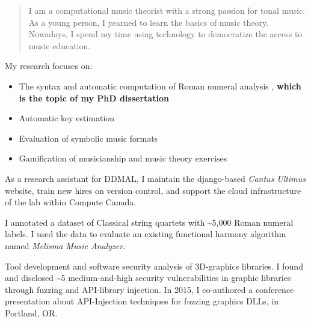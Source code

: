 \documentclass[10pt,a4paper,ragged2e,withhyper]{altacv}
\begin{document}
\begin{paracol}{2}

\begin{quote}
I am a computational music theorist with a strong passion for tonal music.
As a young person, I yearned to learn the basics of music theory.
Nowadays, I spend my time using technology to democratize the access to music education.
\end{quote}


My research focuses on:
\begin{itemize}
    \item The syntax \parencite{napoles_lopez_harmalysis_2020} and automatic computation of Roman numeral analysis \parencite{napoles_lopez_augmentednet_2021}, \textbf{which is the topic of my PhD dissertation}
    \item Automatic key estimation \parencite{napoles_lopez_key-finding_2019, napoles_lopez_local_2020}
    \item Evaluation of symbolic music formats \parencite{napoles_lopez_encoding_2018, napoles_lopez_effects_2019}
    \item Gamification of musicianship and music theory exercises \parencite{napoles_lopez_-re-myth_2020, napoles_lopez_dandelot_2019}
\end{itemize}
As a research assistant for DDMAL, I maintain the django-based \emph{Cantus Ultimus} website, train new hires on version control, and support the cloud infrastructure of the lab within Compute Canada.

\medskip

I annotated a dataset of Classical string quartets with \textasciitilde{}5,000 Roman numeral labels. 
I used the data to evaluate an existing functional harmony algorithm named \emph{Melisma Music Analyzer}.

\medskip

Tool development and software security analysis of 3D-graphics libraries. 
I found and disclosed \textasciitilde{}5 medium-and-high security vulnerabilities in graphic libraries through fuzzing and API-library injection. 
In 2015, I co-authored a conference presentation about API-Injection techniques for fuzzing graphics DLLs, in Portland, OR.


\end{paracol}
\end{document}
